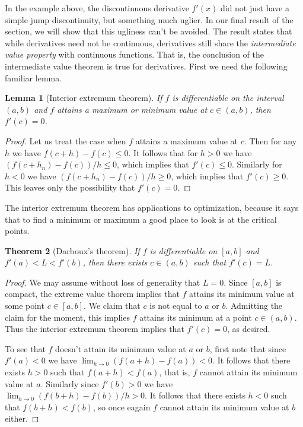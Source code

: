 \documentclass[11pt,oneside]{amsbook}
\theoremstyle{definition}
\theoremstyle{plain}
\newtheorem{thm}{Theorem}[section]
\newtheorem{lem}[thm]{Lemma}
\theoremstyle{definition}
\theoremstyle{remark}
\numberwithin{equation}{section}
\numberwithin{figure}{section}
\begin{document}
In the example above, the discontinuous derivative $f'(x)$ did not just have a simple jump discontinuity, but something much uglier. In our final result of the section, we will show that this ugliness can't be avoided. The result states that while derivatives need not be continuous, derivatives still share the \emph{intermediate value property} with continuous functions. That is, the conclusion of the intermediate value theorem is true for derivatives. First we need the following familiar lemma.

\begin{lem}[Interior extremum theorem]
  \label{thm:iet}
  If $f$ is differentiable on the interval $(a,b)$ and $f$ attains a maximum or minimum value at $c\in(a,b)$, then $f'(c)=0$.
\end{lem}

\begin{proof}
  Let us treat the case when $f$ attains a maximum value at $c$. Then for any $h$ we have $f(c+h)-f(c)\leq0$. It follows that for $h>0$ we have $(f(c+h_n)-f(c))/h\leq0$, which implies that $f'(c)\leq0$. Similarly for $h<0$ we have $(f(c+h_n)-f(c))/h\geq0$, which implies that $f'(c)\geq0$. This leaves only the possibility that $f'(c)=0$.
\end{proof}

The interior extremum theorem has applications to optimization, because it says that to find a minimum or maximum a good place to look is at the critical points.

\begin{thm}[Darboux's theorem]
  If $f$ is differentiable on $[a,b]$ and $f'(a)<L<f'(b)$, then there exists $c\in(a,b)$ such that $f'(c)=L$.
\end{thm}

\begin{proof}
  We may assume without loss of generality that $L=0$. Since $[a,b]$ is compact, the extreme value thorem implies that $f$ attains its minimum value at some point $c\in[a,b]$. We claim that $c$ is not equal to $a$ or $b$. Admitting the claim for the moment, this implies $f$ attains its minimum at a point $c\in(a,b)$. Thus the interior extremum theorem implies that $f'(c)=0$, as desired.

  To see that $f$ doesn't attain its minimum value at $a$ or $b$, first note that since $f'(a)<0$ we have $\lim_{h\to0}(f(a+h)-f(a))<0$. It follows that there exists $h>0$ such that $f(a+h)<f(a)$, that is, $f$ cannot attain its minimum value at $a$. Similarly since $f'(b)>0$ we have $\lim_{h\to0}(f(b+h)-f(b))/h>0$. It follows that there exists $h<0$ such that $f(b+h)<f(b)$, so once eagain $f$ cannot attain its minimum value at $b$ either.
\end{proof}
\end{document}
